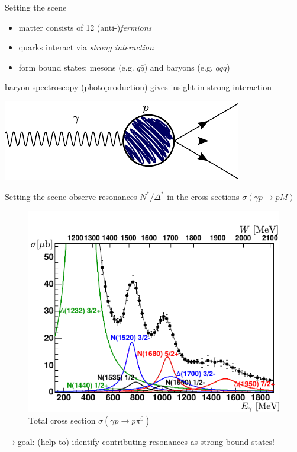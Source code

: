 \documentclass[11pt,aspectratio=169,dvipsnames]{beamer}
\newcommand{\thecolor}{black!70!blue}
\begin{document}
	
	\begin{frame}{Setting the scene}
		\setcounter{page}{1}
		\begin{tcolorbox}[colback=blue!5,colframe=\thecolor,title=The Standard Model of Particle Physics]
			\begin{itemize}
				\item matter consists of 12 (anti-)\emph{fermions}
				\item quarks interact via \emph{strong interaction} 
				\item form bound states: mesons (e.g. $q\bar{q}$) and baryons (e.g. $qqq$)
			\end{itemize} 
		\end{tcolorbox}
		baryon spectroscopy (photoproduction) gives insight in strong interaction
		\begin{center}
			\includegraphics[width=.6\linewidth]{feynman}
		\end{center}
		
		
		
		
	\end{frame}
	\begin{frame}{Setting the scene}
		observe resonances $N^*/\Delta^*$ in the cross sections $\sigma(\gamma p\to p M)$
		\vspace{-0.5cm}
		\begin{figure}
			\centering
			\includegraphics[width=.5\linewidth]{partialwaves}
			\caption*{Total cross section $\sigma(\gamma p\to p \pi^0)$ }
		\end{figure}
		$\to$goal: (help to) identify contributing resonances as strong bound states!\\
	\end{frame}
\end{document}
